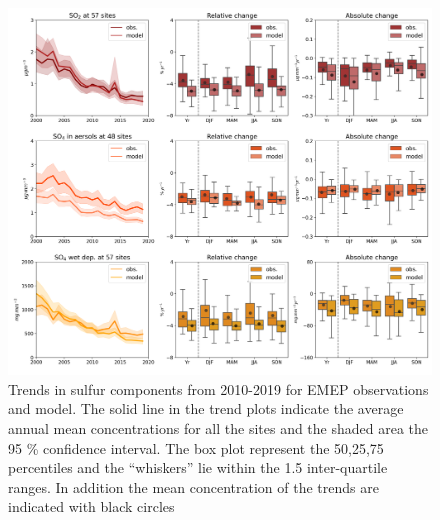 \begin{figure}
	\centering
	\includegraphics[width=0.74\paperwidth]{FIGS_TRENDS/sulfur_trends.png}
	\caption{\label{fig:SOx_trends}Trends in sulfur components from 2010-2019 for EMEP observations and model. The solid line in the trend plots indicate the average annual mean concentrations for all the sites and the shaded area the 95 \% confidence interval. The box plot represent the 50,25,75 percentiles and the “whiskers” lie within the 1.5 inter-quartile ranges. In addition the mean concentration of the trends are indicated with black circles}
\end{figure}

